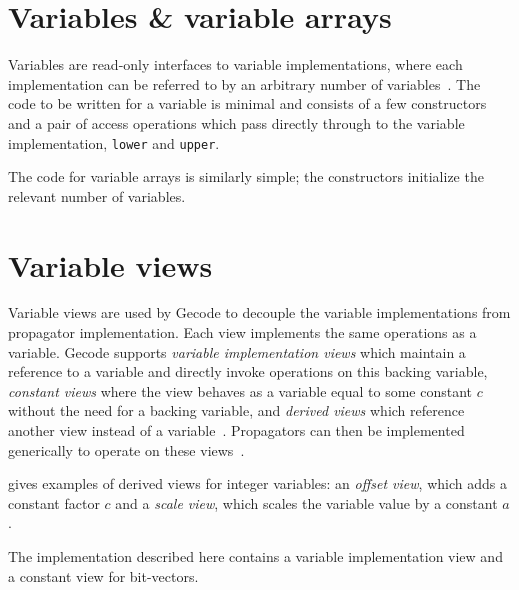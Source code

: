 \documentclass[a4paper,10pt,twoside,openright]{book}
\newcommand*\cd[1]{\texttt{#1}}
\begin{document}
\section{Variables \& variable arrays}
Variables are read-only interfaces to variable implementations, where each implementation can be referred to by an arbitrary number of variables~\cite{MPG:V}. The code to be written for a variable is minimal and consists of a few constructors and a pair of access operations which pass directly through to the variable implementation, \cd{lower} and \cd{upper}. 

The code for variable arrays is similarly simple; the constructors initialize the relevant number of variables.

\section{Variable views}
Variable views are used by Gecode to decouple the variable implementations from propagator implementation.
Each view implements the same operations as a variable.
Gecode supports \textit{variable implementation views} which 
maintain a reference to a variable and directly invoke operations on this backing variable,
\textit{constant views} where the view behaves as a variable equal to some constant $c$ without the need for a backing variable,
and 
\textit{derived views} which reference another view instead of a variable~\cite{MPG:P}.
Propagators can then be implemented generically to operate on these views~\cite{views}.

\cite{MPG:V}
gives examples of derived views for integer variables:
an \textit{offset view}, which adds a constant factor $c$ and
a \textit{scale view}, which scales the variable value by a constant $a$.

The implementation described here 
contains a variable implementation view and a constant view for bit-vectors.
\end{document}
